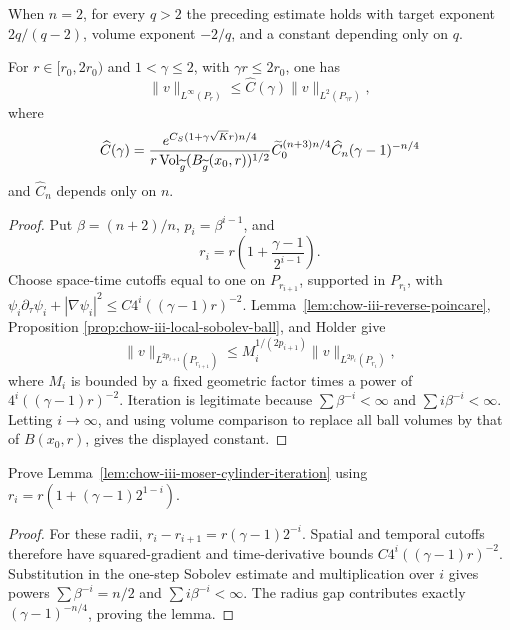\begin{remark}
\label{rem:chow-iii-two-dimensional-local-sobolev}
When \(n=2\), for every \(q>2\) the preceding estimate holds with target
exponent \(2q/(q-2)\), volume exponent \(-2/q\), and a constant depending
only on \(q\).
\end{remark}

\begin{lemma}
\label{lem:chow-iii-moser-cylinder-iteration}
For \(r\in[r_0,2r_0)\) and \(1<\gamma\leq2\), with
\(\gamma r\leq2r_0\), one has
\[
 \|v\|_{L^\infty(P_r)}\leq \widehat C(\gamma)
 \|v\|_{L^2(P_{\gamma r})},
\]
where
\[
 \widehat C(\gamma)=
 \frac{e^{C_S(1+\gamma\sqrt K r)n/4}}
 {r\operatorname{Vol}_{\widetilde g}(B_{\widetilde g}(x_0,r))^{1/2}}
 \widetilde C_0^{(n+3)n/4}\widehat C_n
 (\gamma-1)^{-n/4}
\]
and \(\widehat C_n\) depends only on \(n\).
\end{lemma}
\begin{proof}
Put \(\beta=(n+2)/n\), \(p_i=\beta^{i-1}\), and
\[
 r_i=r\left(1+\frac{\gamma-1}{2^{i-1}}\right).
\]
Choose space-time cutoffs equal to one on \(P_{r_{i+1}}\), supported in
\(P_{r_i}\), with
\(\psi_i\partial_\tau\psi_i+|\nabla\psi_i|^2
 \leq C4^i((\gamma-1)r)^{-2}\).
Lemma~\ref{lem:chow-iii-reverse-poincare}, Proposition
\ref{prop:chow-iii-local-sobolev-ball}, and Holder give
\[
 \|v\|_{L^{2p_{i+1}}(P_{r_{i+1}})}
 \leq M_i^{1/(2p_{i+1})}
 \|v\|_{L^{2p_i}(P_{r_i})},
\]
where \(M_i\) is bounded by a fixed geometric factor times a power of
\(4^i((\gamma-1)r)^{-2}\).  Iteration is legitimate because
\(\sum\beta^{-i}<\infty\) and \(\sum i\beta^{-i}<\infty\).  Letting
\(i\to\infty\), and using volume comparison to replace all ball volumes by
that of \(B(x_0,r)\), gives the displayed constant.
\end{proof}

\begin{example}
\label{ex:chow-iii-rescaled-moser-cylinder-iteration}
Prove Lemma~\ref{lem:chow-iii-moser-cylinder-iteration} using
\(r_i=r(1+(\gamma-1)2^{1-i})\).
\end{example}
\begin{proof}
For these radii,
\(r_i-r_{i+1}=r(\gamma-1)2^{-i}\).  Spatial and temporal cutoffs therefore
have squared-gradient and time-derivative bounds
\(C4^i((\gamma-1)r)^{-2}\).  Substitution in the one-step Sobolev estimate
and multiplication over \(i\) gives powers
\(\sum\beta^{-i}=n/2\) and \(\sum i\beta^{-i}<\infty\).  The radius gap
contributes exactly \((\gamma-1)^{-n/4}\), proving the lemma.
\end{proof}

